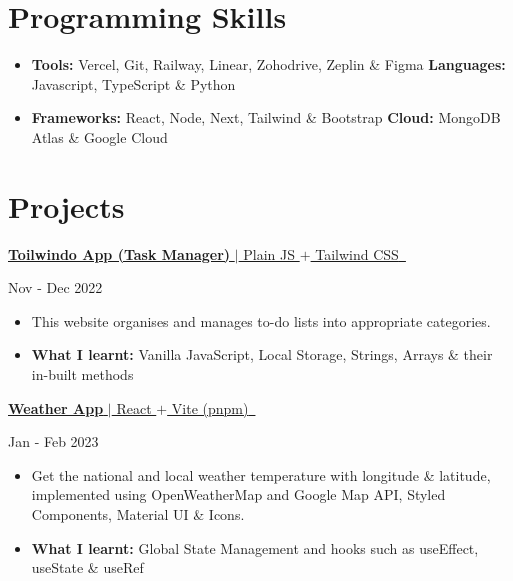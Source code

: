 \documentclass[letterpaper,11pt]{article}
\newcommand{\resumeItem}[2]{
  \item\small{
    \textbf{#1}{#2 \vspace{-2pt}}
  }
}
\newcommand{\project}[2]{
\textbf{}{
\href{#2}{{#1} \,\faExternalLink}
}
    \hfill
}
\newcommand{\projectHeading}[3]{\project{#1}{#2}
{#3}\\ \vspace{-1pt}}
\newcommand{\resumeSubHeadingListStart}{\begin{itemize}[leftmargin=*]}
\newcommand{\resumeSubHeadingListEnd}{\end{itemize}}
\newcommand{\resumeItemListStart}{\begin{itemize}}
\newcommand{\resumeItemListEnd}{\end{itemize}\vspace{-5pt}}
\begin{document}
\section{Programming Skills}
\resumeSubHeadingListStart
\item{
      \textbf{Tools: }{Vercel, Git, Railway, Linear, Zohodrive, Zeplin \& Figma}
      \hfill
      \textbf{Languages: }{Javascript, TypeScript \& Python}}
\vspace{-7pt}
\item{
      \textbf{Frameworks: }{React, Node, Next, Tailwind \& Bootstrap}
      \hfill
      \textbf{Cloud: }{MongoDB Atlas \& Google Cloud}}
\resumeSubHeadingListEnd
 
\section{Projects}
\projectHeading{\textbf{Toilwindo App (Task Manager)} $|$ Plain JS $+$ Tailwind CSS}{https://aminoxix.github.io/toilwindo}{Nov - Dec 2022}
\vspace{-5pt}
\resumeItemListStart
\resumeItem{}{This website organises and manages to-do lists into appropriate categories.}
\vspace{-5pt}
\resumeItem{What I learnt: }{Vanilla JavaScript, Local Storage, Strings, Arrays \& their in-built methods}
\resumeItemListEnd
\vspace{6pt}
\projectHeading{\textbf{Weather App} $|$ React $+$ Vite (pnpm)}{https://github.com/aminoxix/ClimateCheck}{Jan - Feb 2023}
\vspace{-5pt}
\resumeItemListStart
\resumeItem{}{Get the national and local weather temperature with longitude \& latitude, implemented using OpenWeatherMap and Google Map API, Styled Components, Material UI \& Icons.}
\vspace{-5pt}
\resumeItem{What I learnt: }{Global State Management and hooks such as useEffect, useState \& useRef}
\resumeItemListEnd

\end{document}
